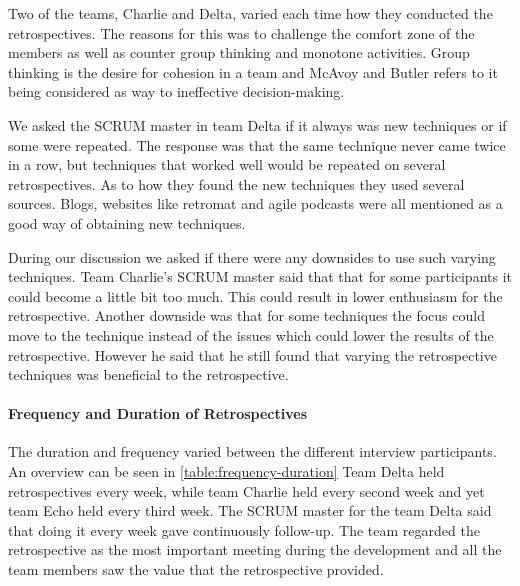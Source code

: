 Two of the teams, Charlie and Delta, varied each time how they conducted the retrospectives. The reasons for this was to challenge the comfort zone of the members as well as counter group thinking and monotone activities. Group thinking is the desire for cohesion in a team and McAvoy and Butler \cite{Mcavoy2007} refers to it being considered as way to ineffective decision-making. 

We asked the SCRUM master in team Delta if it always was new techniques or if some were repeated. The response was that the same technique never came twice in a row, but techniques that worked well would be repeated on several retrospectives. As to how they found the new techniques they used several sources. Blogs, websites like retromat \cite{retromat2015} and agile podcasts were all mentioned as a good way of obtaining new techniques. 

During our discussion we asked if there were any downsides to use such varying techniques. Team Charlie's SCRUM master said that that for some participants it could become a little bit too much. This could result in lower enthusiasm for the retrospective. Another downside was that for some techniques the focus could move to the technique instead of the issues which could lower the results of the retrospective. However he said that he still found that varying the retrospective techniques was beneficial to the retrospective. 

\begin{table}[!h]
	\begin{center}
	\caption{Retrospective Techniques Used}
	\label{table:retrospective-techique}
	\end{center}
\end{table}

\label{question-3a}
\paragraph{Frequency and Duration of Retrospectives}
The duration and frequency varied between the different interview participants. An overview can be seen in \autoref{table:frequency-duration} Team Delta held retrospectives every week, while team Charlie held every second week and yet team Echo held every third week. The SCRUM master for the team Delta said that doing it every week gave continuously follow-up. The team regarded the retrospective as the most important meeting during the development and all the team members saw the value that the retrospective provided. 

